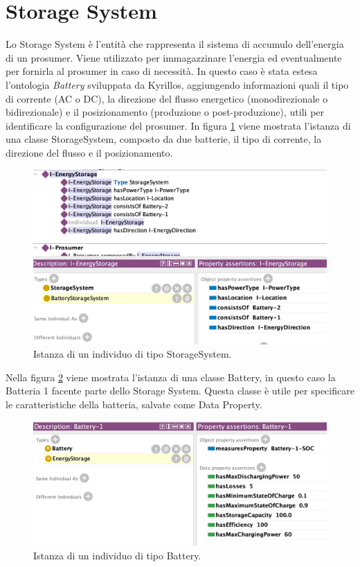 \section{Storage System}
Lo Storage System è l'entità che rappresenta il sistema di accumulo dell'energia di un prosumer. Viene utilizzato per immagazzinare l'energia ed eventualmente per fornirla al prosumer in caso di necessità.
In questo caso è stata estesa l'ontologia \textit{Battery} sviluppata da Kyrillos, aggiungendo informazioni quali il tipo di corrente (AC o DC), la direzione del flusso energetico (monodirezionale o bidirezionale) e il posizionamento (produzione o post-produzione), utili per identificare la configurazione del prosumer.
In figura \ref{fig:individual_storagesystem} viene mostrata l'istanza di una classe StorageSystem, composto da due batterie, il tipo di corrente, la direzione del flusso e il posizionamento.
\begin{figure}[H]
    \centering
    \includegraphics[width=12cm]{images/individual_storagesystem.png}
    \caption{Istanza di un individuo di tipo StorageSystem.}
    \label{fig:individual_storagesystem}
\end{figure}
Nella figura \ref{fig:individual_bat1} viene mostrata l'istanza di una classe Battery, in questo caso la Batteria 1 facente parte dello Storage System. Questa classe è utile per specificare le caratteristiche della batteria, salvate come Data Property.
\begin{figure}[H]
    \centering
    \includegraphics[width=12cm]{images/individual_bat1.png}
    \caption{Istanza di un individuo di tipo Battery.}
    \label{fig:individual_bat1}
\end{figure}
